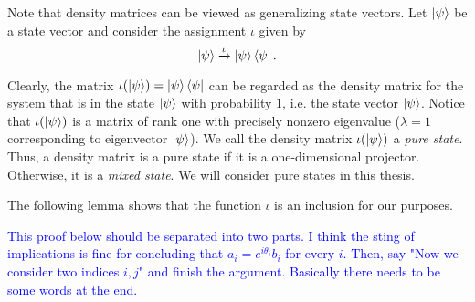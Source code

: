 \bigskip

Note that density matrices can be viewed as generalizing state vectors.  Let $\ket{\psi}$ be a state vector and consider the assignment $\iota$ given by
$$\ket{\psi} \xrightarrow{\iota} \ket{\psi}\bra{\psi}.$$

Clearly, the matrix $\iota(\ket{\psi})=\ket{\psi}\bra{\psi}$ can be regarded as the density matrix for the system that is in the state $\ket{\psi}$ with probability $1$, i.e. the state vector $\ket{\psi}$.  Notice that $\iota({\ket{\psi}})$ is a matrix of rank one with precisely nonzero eigenvalue ($\lambda=1$ corresponding to eigenvector $\ket{\psi}$).  We call the density matrix $\iota(\ket{\psi})$ a \textit{pure state}. Thus, a density matrix is a pure state if it is a one-dimensional projector. Otherwise, it is a \textit{mixed state}. We will consider pure states in this thesis.

The following lemma shows that the function $\iota$ is an inclusion for our purposes.

\textcolor{blue}{This proof below should be separated into two parts.  I think the sting of implications is fine for concluding that $a_i=e^{i\theta_i}b_i$ for every $i$.  Then, say "Now we consider two indices $i,j$" and finish the argument.  Basically there needs to be some words at the end.}

